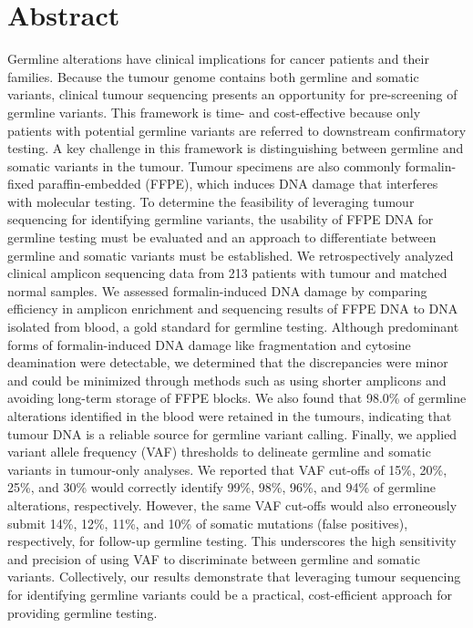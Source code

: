 
\chapter{Abstract}

Germline alterations have clinical implications for cancer patients and their families. Because the tumour genome contains both germline and somatic variants, clinical tumour sequencing presents an opportunity for pre-screening of germline variants. This framework is time- and cost-effective because only patients with potential germline variants are referred to downstream confirmatory testing. A key challenge in this framework is distinguishing between germline and somatic variants in the tumour. Tumour specimens are also commonly formalin-fixed paraffin-embedded (FFPE), which induces DNA damage that interferes with molecular testing. To determine the feasibility of leveraging tumour sequencing for identifying germline variants, the usability of FFPE DNA for germline testing must be evaluated and an approach to differentiate between germline and somatic variants must be established. We retrospectively analyzed clinical amplicon sequencing data from 213 patients with tumour and matched normal samples. We assessed formalin-induced DNA damage by comparing efficiency in amplicon enrichment and sequencing results of FFPE DNA to DNA isolated from blood, a gold standard for germline testing. Although predominant forms of formalin-induced DNA damage like fragmentation and cytosine deamination were detectable, we determined that the discrepancies were minor and could be minimized through methods such as using shorter amplicons and avoiding long-term storage of FFPE blocks. We also found that 98.0\% of germline alterations identified in the blood were retained in the tumours, indicating that tumour DNA is a reliable source for germline variant calling. Finally, we applied variant allele frequency (VAF) thresholds to delineate germline and somatic variants in tumour-only analyses. We reported that VAF cut-offs of 15\%, 20\%, 25\%, and 30\% would correctly identify 99\%, 98\%, 96\%, and 94\% of germline alterations, respectively. However, the same VAF cut-offs would also erroneously submit 14\%, 12\%, 11\%, and 10\% of somatic mutations (false positives), respectively, for follow-up germline testing. This underscores the high sensitivity and precision of using VAF to discriminate between germline and somatic variants. Collectively, our results demonstrate that leveraging tumour sequencing for identifying germline variants could be a practical, cost-efficient approach for providing germline testing.



